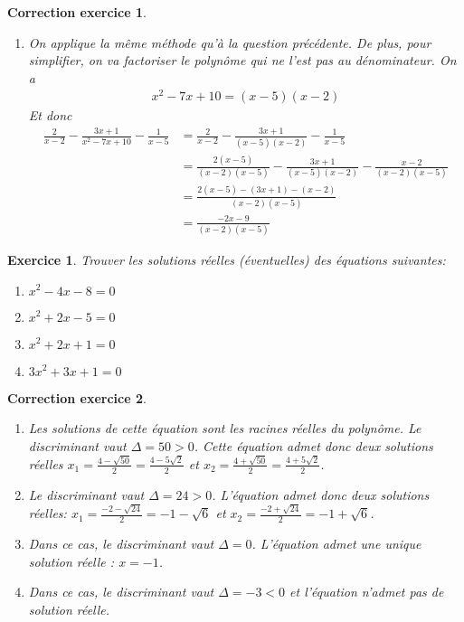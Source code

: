 \documentclass[12pt]{article}
\newtheorem{exercice}{\bf Exercice}
\newtheorem{correction}{\bf Correction exercice}
\newenvironment{exo}{
\begin{exercice}\smallskip\normalfont}{\end{exercice}
}
\newenvironment{cor}{
\begin{correction}\smallskip\normalfont}{\end{correction}
}
\newif\ifcorrige\corrigetrue
\begin{document}
\begin{cor}
\begin{enumerate}
\item On applique la m\^eme m\'ethode qu'\`a la question pr\'ec\'edente.
  De plus, pour simplifier, on va factoriser le polyn\^ome qui ne l'est pas au d\'enominateur.
  On a
  \begin{align*}
    x^2-7x+10 = (x-5)(x-2)
  \end{align*}
  Et donc
  \begin{align*}
    \frac{2}{x-2} - \frac{3x+1}{x^2-7x+10} - \frac{1}{x-5}
    &= \frac{2}{x-2} - \frac{3x+1}{(x-5)(x-2)} - \frac{1}{x-5}
    \\
    &= \frac{2(x-5)}{(x-2)(x-5)} - \frac{3x+1}{(x-5)(x-2)} - \frac{x-2}{(x-2)(x-5)}
    \\
    &= \frac{2(x-5) - (3x+1) - (x-2)}{(x-2)(x-5)}
    \\
    &= \frac{-2x - 9}{(x-2)(x-5)}
  \end{align*}
\end{enumerate}
\end{cor}
\color{black}
\fi



\begin{exo} Trouver les solutions r\'eelles (\'eventuelles) des \'equations suivantes:
\begin{multicols}{2}
\begin{enumerate}
\item $x^2 - 4x - 8 = 0$
\item $x^2 + 2x - 5 = 0$
\item $x^2 + 2x + 1 = 0$
\item $3x^2 + 3x + 1 = 0$
\end{enumerate}
\end{multicols}
\end{exo}

\ifcorrige
\color{magenta}
\begin{cor}
  $\qquad$
\begin{enumerate}
\item Les solutions de cette \'equation sont les racines r\'eelles du polyn\^ome.
  Le discriminant vaut $\Delta = 50 > 0$.
  Cette \'equation admet donc deux solutions r\'eelles
  $x_1 = \frac{4 - \sqrt{50}}{2} = \frac{4 - 5\sqrt{2}}{2}$
  et
  $x_2 = \frac{4 + \sqrt{50}}{2} = \frac{4 + 5\sqrt{2}}{2}$.
\item Le discriminant vaut $\Delta = 24 > 0$.
  L'\'equation admet donc deux solutions r\'eelles:
  $x_1 = \frac{-2 - \sqrt{24}}{2} = -1 - \sqrt{6}$
  et $x_2 = \frac{-2 + \sqrt{24}}{2} = -1 + \sqrt{6}$.
\item Dans ce cas, le discriminant vaut $\Delta = 0$.
  L'\'equation admet une unique solution r\'eelle : $x = -1$.
\item Dans ce cas, le discriminant vaut $\Delta = -3 < 0$
  et l'\'equation n'admet pas de solution r\'eelle.
\end{enumerate}
\end{cor}
\color{black}
\fi
\end{document}
